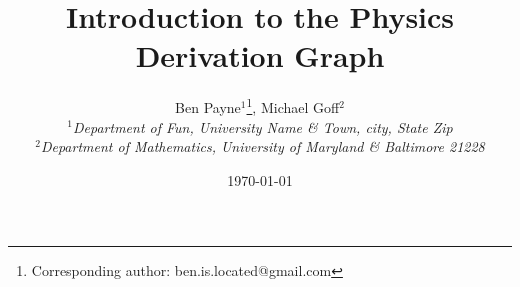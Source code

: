 \documentclass{article}
\begin{document}
\title{Introduction to the Physics Derivation Graph}

\author{Ben Payne$^{1}$\footnote{Corresponding author: ben.is.located@gmail.com}, Michael Goff$^{2}$\\
{\it $^{1}$Department of Fun, University Name \& Town, city, State Zip}\\
{\it $^{2}$Department of Mathematics, University of Maryland \& Baltimore 21228}}

\date{\today}


\maketitle %
\end{document}
